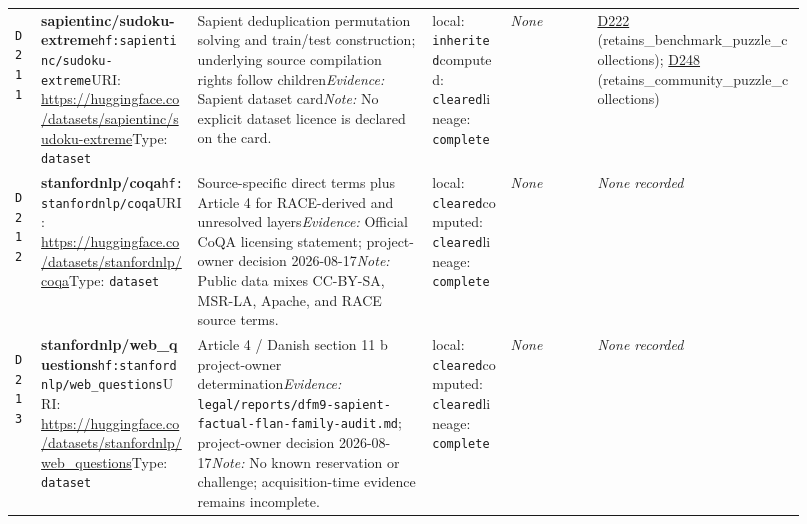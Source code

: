 \documentclass[9pt,a4paper]{article}
\newcommand{\depid}[1]{\hypertarget{dep:#1}{\texttt{#1}}}
\begin{document}
\begin{landscape}
\begin{longtable}{@{}L{0.035\linewidth}L{0.185\linewidth}L{0.27\linewidth}L{0.09\linewidth}L{0.10\linewidth}L{0.24\linewidth}@{}}
\depid{D211} & \textbf{sapientinc/sudoku-extreme}\newline \nolinkurl{hf:sapientinc/sudoku-extreme}\newline URI: \url{https://huggingface.co/datasets/sapientinc/sudoku-extreme}\newline Type: \texttt{dataset} & Sapient deduplication permutation solving and train/test construction; underlying source compilation rights follow children\newline \textit{Evidence:} Sapient dataset card\newline \textit{Note:} No explicit dataset licence is declared on the card. & local: \texttt{inherited}\newline computed: \texttt{cleared}\newline lineage: \texttt{complete} & \textit{None} & \hyperlink{dep:D222}{D222} (retains\_benchmark\_puzzle\_collections); \hyperlink{dep:D248}{D248} (retains\_community\_puzzle\_collections) \\
\depid{D212} & \textbf{stanfordnlp/coqa}\newline \nolinkurl{hf:stanfordnlp/coqa}\newline URI: \url{https://huggingface.co/datasets/stanfordnlp/coqa}\newline Type: \texttt{dataset} & Source-specific direct terms plus Article 4 for RACE-derived and unresolved layers\newline \textit{Evidence:} Official CoQA licensing statement; project-owner decision 2026-08-17\newline \textit{Note:} Public data mixes CC-BY-SA, MSR-LA, Apache, and RACE source terms. & local: \texttt{cleared}\newline computed: \texttt{cleared}\newline lineage: \texttt{complete} & \textit{None} & \textit{None recorded} \\
\depid{D213} & \textbf{stanfordnlp/web\_questions}\newline \nolinkurl{hf:stanfordnlp/web_questions}\newline URI: \url{https://huggingface.co/datasets/stanfordnlp/web_questions}\newline Type: \texttt{dataset} & Article 4 / Danish section 11 b project-owner determination\newline \textit{Evidence:} \nolinkurl{legal/reports/dfm9-sapient-factual-flan-family-audit.md}; project-owner decision 2026-08-17\newline \textit{Note:} No known reservation or challenge; acquisition-time evidence remains incomplete. & local: \texttt{cleared}\newline computed: \texttt{cleared}\newline lineage: \texttt{complete} & \textit{None} & \textit{None recorded} \\

\end{longtable}
\end{landscape}
\end{document}
